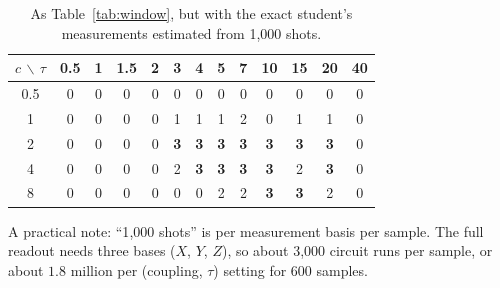 \documentclass[11pt]{article}
\begin{document}
\begin{table}[H]\centering\small
\caption{As Table~\ref{tab:window}, but with the exact student's measurements estimated from 1{,}000 shots.}\label{tab:window1000}
\begin{tabular}{@{}ccccccccccccc@{}}\toprule
$c$ $\backslash$ $\tau$ & 0.5 & 1 & 1.5 & 2 & 3 & 4 & 5 & 7 & 10 & 15 & 20 & 40\\\midrule
0.5 & 0 & 0 & 0 & 0 & 0 & 0 & 0 & 0 & 0 & 0 & 0 & 0\\
1   & 0 & 0 & 0 & 0 & 1 & 1 & 1 & 2 & 0 & 1 & 1 & 0\\
2   & 0 & 0 & 0 & 0 & \textbf{3} & \textbf{3} & \textbf{3} & \textbf{3} & \textbf{3} & \textbf{3} & \textbf{3} & 0\\
4   & 0 & 0 & 0 & 0 & 2 & \textbf{3} & \textbf{3} & \textbf{3} & \textbf{3} & 2 & \textbf{3} & 0\\
8   & 0 & 0 & 0 & 0 & 0 & 0 & 2 & 2 & \textbf{3} & \textbf{3} & 2 & 0\\\bottomrule
\end{tabular}
\end{table}

A practical note: ``1{,}000 shots'' is per measurement basis per sample. The full readout needs three bases
($X$, $Y$, $Z$), so about 3{,}000 circuit runs per sample, or about $1.8$ million per (coupling, $\tau$)
setting for 600 samples.



\end{document}
